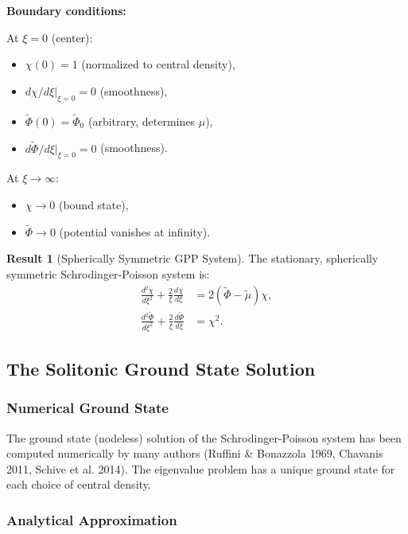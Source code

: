 \documentclass[11pt,a4paper]{article}
\theoremstyle{definition}
\newtheorem{result}{Result}
\theoremstyle{remark}
\begin{document}
\textbf{Boundary conditions:}

At $\xi = 0$ (center):
\begin{itemize}
    \item $\chi(0) = 1$ (normalized to central density),
    \item $d\chi/d\xi|_{\xi=0} = 0$ (smoothness),
    \item $\tilde{\Phi}(0) = \tilde{\Phi}_0$ (arbitrary, determines $\mu$),
    \item $d\tilde{\Phi}/d\xi|_{\xi=0} = 0$ (smoothness).
\end{itemize}

At $\xi \to \infty$:
\begin{itemize}
    \item $\chi \to 0$ (bound state),
    \item $\tilde{\Phi} \to 0$ (potential vanishes at infinity).
\end{itemize}

\begin{result}[Spherically Symmetric GPP System]
The stationary, spherically symmetric Schrodinger-Poisson system is:
\begin{equation}
\boxed{
\begin{aligned}
\frac{d^2\chi}{d\xi^2} + \frac{2}{\xi}\frac{d\chi}{d\xi} &= 2(\tilde{\Phi} - \tilde{\mu})\chi, \\
\frac{d^2\tilde{\Phi}}{d\xi^2} + \frac{2}{\xi}\frac{d\tilde{\Phi}}{d\xi} &= \chi^2.
\end{aligned}
}
\end{equation}
\end{result}

\subsection{The Solitonic Ground State Solution}
\label{sec:soliton_solution}

\subsubsection{Numerical Ground State}

The ground state (nodeless) solution of the Schrodinger-Poisson system has been computed numerically by many authors (Ruffini \& Bonazzola 1969, Chavanis 2011, Schive et al. 2014). The eigenvalue problem has a unique ground state for each choice of central density.

\subsubsection{Analytical Approximation}
\end{document}
